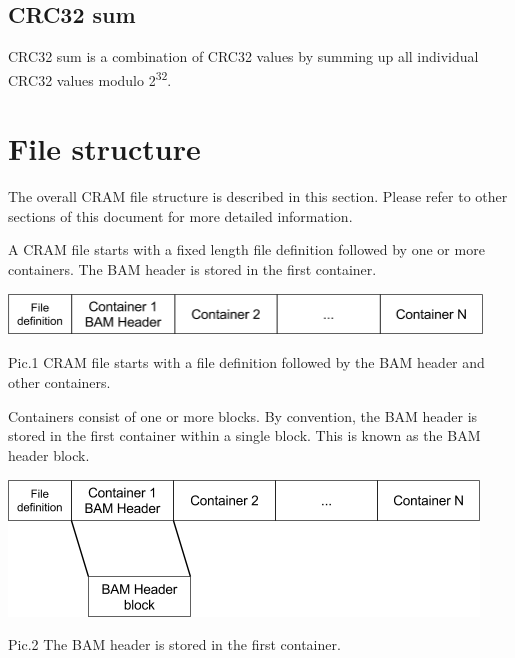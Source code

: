 \documentclass[a4paper]{article}
\begin{document}
\subsection{\textbf{CRC32 sum}}
CRC32 sum is a combination of CRC32 values by summing up all individual CRC32 values modulo 2\textsuperscript{32}. 

\section{\textbf{File structure}}

The overall CRAM file structure is described in this section. Please refer to other 
sections of this document for more detailed information. 

A CRAM file starts with a fixed length file definition followed by one or more 
containers. The BAM header is stored in the first container.

\includegraphics[width=356pt, height=31pt, keepaspectratio=true]{img/CRAMFileFormat2-1-fig001.png}

Pic.1 CRAM file starts with a file definition followed by the BAM header and other 
containers.

Containers consist of one or more blocks. By convention, the BAM header is stored 
in the first container within a single block. This is known as the BAM header block.

\includegraphics[width=354pt, height=103pt, keepaspectratio=true]{img/CRAMFileFormat2-1-fig002.png}

Pic.2 The BAM header is stored in the first container.
\end{document}
